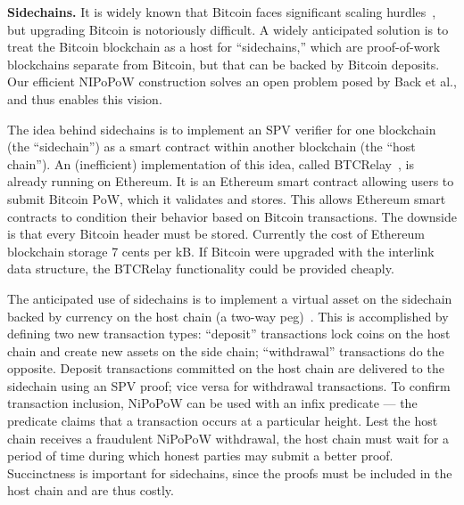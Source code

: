 \noindent
\textbf{Sidechains.}
\label{sec.sidechains}
It is widely known that Bitcoin faces significant scaling
hurdles~\cite{onscaling}, but upgrading Bitcoin is notoriously difficult. A
widely anticipated solution is to treat the Bitcoin blockchain as a host for
``sidechains,'' which are proof-of-work blockchains separate from Bitcoin, but
that can be backed by Bitcoin deposits. Our efficient NIPoPoW construction
solves an open problem posed by Back et al., and thus enables this vision.

The idea behind sidechains is to implement an SPV verifier for one blockchain
(the ``sidechain'') as a smart contract within another blockchain (the ``host
chain''). An (inefficient) implementation of this idea, called
BTCRelay~\cite{ethereum}, is already running on Ethereum. It is an Ethereum
smart contract allowing users to submit Bitcoin PoW, which it validates and
stores. This allows Ethereum smart contracts to condition their behavior based
on Bitcoin transactions. The downside is that every Bitcoin header must be
stored. Currently the cost of Ethereum blockchain storage 7 cents per kB. If
Bitcoin were upgraded with the interlink data structure, the BTCRelay
functionality could be provided cheaply.

The anticipated use of sidechains is to implement a virtual asset on the
sidechain backed by currency on the host chain (a two-way
peg)~\cite{sidechains}. This is accomplished by defining two new transaction
types: ``deposit'' transactions lock coins on the host chain and create new
assets on the side chain; ``withdrawal'' transactions do the opposite. Deposit
transactions committed on the host chain are delivered to the sidechain using an
SPV proof; vice versa for withdrawal transactions. To confirm transaction
inclusion, NiPoPoW can be used with an infix predicate --- the predicate claims
that a transaction occurs at a particular height. Lest the host chain receives a
fraudulent NiPoPoW withdrawal, the host chain must wait for a period of time
during which honest parties may submit a better proof. Succinctness is important
for sidechains, since the proofs must be included in the host chain and are thus
costly.
